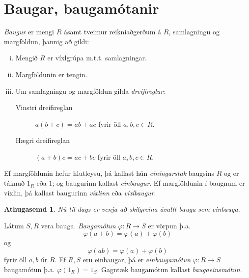 \documentclass[a4paper,icelandic,11pt]{book}
\theoremstyle{plain}
\newtheorem*{ath}{Athugasemd}
\begin{document}
\section{Baugar, baugamótanir}
\begin{skilgr}
  \emph{Baugur} er mengi $R$ ásamt tveimur reikniaðgerðum á $R$,
  samlagningu og margföldun, þannig að gildi:
  \begin{enumerate}[(i)]
    \item Mengið $R$ er víxlgrúpa m.t.t. samlagningar.
    \item Margföldunin er tengin.
    \item Um samlagningu og margföldun gilda
      \emph{dreifireglur}:
    \begin{description}
      \item[Vinstri dreifireglan] $a(b+c) = ab + ac$ fyrir öll $a,b,c\in R$.
      \item[Hægri dreifireglan] $(a+b)c = ac + bc$ fyrir öll $a,b,c\in R$.
    \end{description}
  \end{enumerate}
  Ef margföldunin hefur hlutleysu, þá kallast hún
  \emph{einingarstak} baugsins $R$ og er táknuð $1_R$ eða
  $1$; og baugurinn kallast
  \emph{einbaugur}. Ef margföldunin
  í baugnum er víxlin, þá kallast baugurinn \emph{víxlinn} eða
  \emph{víxlbaugur}.
\end{skilgr}
\begin{ath}
  Nú til dags er venja að skilgreina ávallt bauga sem einbauga.
\end{ath}
\begin{skilgr}
  Látum $S,R$ vera bauga. \emph{Baugamótun} $\varphi:R\to S$
  er vörpun þ.a.
  \[
    \varphi(a+b) = \varphi(a) + \varphi(b)
  \]
  og
  \[
    \varphi(ab) = \varphi(a) + \varphi(b)
  \]
  fyrir öll $a,b$ úr $R$. Ef $R,S$ eru einbaugar, þá er \emph{einbaugamótun}
   $\varphi:R\to S$ baugamótun þ.a. $\varphi(1_R)=1_S$.
  Gagntæk baugamótun kallast \emph{baugaeinsmótun}.
\end{skilgr}
\end{document}
